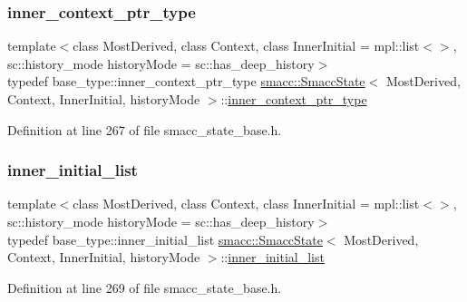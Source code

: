 \subsubsection{\texorpdfstring{inner\+\_\+context\+\_\+ptr\+\_\+type}{inner\_context\_ptr\_type}}
{\footnotesize\ttfamily template$<$class Most\+Derived, class Context, class Inner\+Initial = mpl\+::list$<$$>$, sc\+::history\+\_\+mode history\+Mode = sc\+::has\+\_\+deep\+\_\+history$>$ \\
typedef base\+\_\+type\+::inner\+\_\+context\+\_\+ptr\+\_\+type \hyperlink{classsmacc_1_1SmaccState}{smacc\+::\+Smacc\+State}$<$ Most\+Derived, Context, Inner\+Initial, history\+Mode $>$\+::\hyperlink{classsmacc_1_1SmaccState_a65a772c2e2039e9a59148ba6ffb54d8a}{inner\+\_\+context\+\_\+ptr\+\_\+type}}



Definition at line 267 of file smacc\+\_\+state\+\_\+base.\+h.

\mbox{\label{classsmacc_1_1SmaccState_acb4ac84bce421d39b594510a6b2df558}} 
\subsubsection{\texorpdfstring{inner\+\_\+initial\+\_\+list}{inner\_initial\_list}}
{\footnotesize\ttfamily template$<$class Most\+Derived, class Context, class Inner\+Initial = mpl\+::list$<$$>$, sc\+::history\+\_\+mode history\+Mode = sc\+::has\+\_\+deep\+\_\+history$>$ \\
typedef base\+\_\+type\+::inner\+\_\+initial\+\_\+list \hyperlink{classsmacc_1_1SmaccState}{smacc\+::\+Smacc\+State}$<$ Most\+Derived, Context, Inner\+Initial, history\+Mode $>$\+::\hyperlink{classsmacc_1_1SmaccState_acb4ac84bce421d39b594510a6b2df558}{inner\+\_\+initial\+\_\+list}}



Definition at line 269 of file smacc\+\_\+state\+\_\+base.\+h.

\mbox{\label{classsmacc_1_1SmaccState_a60088405d2d99d468caa0baa3b2830a8}} 
